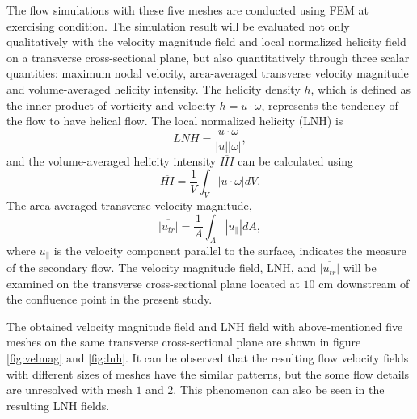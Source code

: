 The flow simulations with these five meshes are conducted using FEM at exercising condition. The simulation result will be evaluated not only qualitatively with the velocity magnitude field and local normalized helicity field on a transverse cross-sectional plane, but also quantitatively through three scalar quantities: maximum nodal velocity, area-averaged transverse velocity magnitude and volume-averaged helicity intensity. The helicity density $h$, which is defined as the inner product of vorticity and velocity $h=u\cdot\omega$, represents the tendency of the flow to have helical flow. The local normalized helicity (LNH) is 
\begin{equation}
LNH=\frac{u\cdot\omega}{\left|u\right|\left|\omega\right|},
\label{eq:LNH}
\end{equation}
and the volume-averaged helicity intensity $\overline{HI}$ can be calculated using
\begin{equation}
\overline{HI}=\frac{1}{V}\int_V \left|u\cdot\omega\right| dV.
\label{eq:HI}
\end{equation}
The area-averaged transverse velocity magnitude,
\begin{equation}
\overline{\left|u_{tr}\right|}=\frac{1}{A}\int_A \left|u _\|\right| dA,
\label{eq:utr}
\end{equation}
where $u _\|$ is the velocity component parallel to the surface, indicates the measure of the secondary flow. The velocity magnitude field, LNH, and $\overline{\left|u_{tr}\right|}$ will be examined on the transverse cross-sectional plane located at $10$ cm downstream of the confluence point in the present study.  

The obtained velocity magnitude field and LNH field with above-mentioned five meshes on the same transverse cross-sectional plane are shown in figure \ref{fig:velmag} and \ref{fig:lnh}. It can be observed that the resulting flow velocity fields with different sizes of meshes have the similar patterns, but the some flow details are unresolved with mesh $1$ and $2$. This phenomenon can also be seen in the resulting LNH fields.

